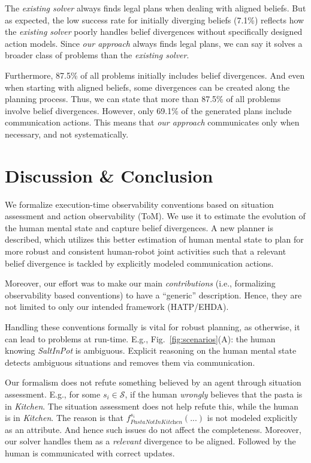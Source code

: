 \documentclass[letterpaper]{article} %
\begin{document}
The \textit{existing solver} always finds legal plans when dealing with aligned beliefs. But as expected, the low success rate for initially diverging beliefs (7.1\%) reflects how the \textit{existing solver} poorly handles belief divergences without specifically designed action models. Since \textit{our approach} always finds legal plans, we can say it solves a broader class of problems than the \textit{existing solver}.

Furthermore, 87.5\% of all problems initially includes belief divergences. And even when starting with aligned beliefs, some divergences can be created along the planning process. Thus, we can state that more than 87.5\% of all problems involve belief divergences. However, only 69.1\% of the generated plans include communication actions. This means that \textit{our approach} communicates only when necessary, and not systematically.   

\section{Discussion \& Conclusion}
We formalize execution-time observability conventions based on situation assessment and action observability (ToM). We use it to estimate the evolution of the human mental state and capture belief divergences. 
A new planner is described, which utilizes this better estimation of human mental state to plan for more robust and consistent human-robot joint activities such that a relevant belief divergence is tackled by explicitly modeled communication actions.  

Moreover, our effort was to make our main \textit{contributions} (i.e., formalizing observability based conventions) to have a ``generic'' description. Hence, they are not limited to only our intended framework (HATP/EHDA).

Handling these conventions formally is vital for robust planning, as otherwise, it can lead to problems at run-time. 
E.g., Fig.~\ref{fig:scenarios}(A): the human knowing \textit{SaltInPot} is ambiguous. 
Explicit reasoning on the human mental state detects ambiguous situations and removes them via communication. 

Our formalism does not refute something believed by an agent through situation assessment. 
E.g., for some $s_i \in \mathcal{S}$, if the human \textit{wrongly} believes that the pasta is in \textit{Kitchen}. The situation assessment does not help refute this, while the human is in \textit{Kitchen}. 
The reason is that $f_{\textit{PastaNotInKitchen}}^{s_i}(...)$ is not modeled explicitly as an attribute. 
And hence such issues do not affect the completeness. 
Moreover, our solver handles them as a \textit{relevant} divergence to be aligned. Followed by the human is communicated with correct updates.


\end{document}
